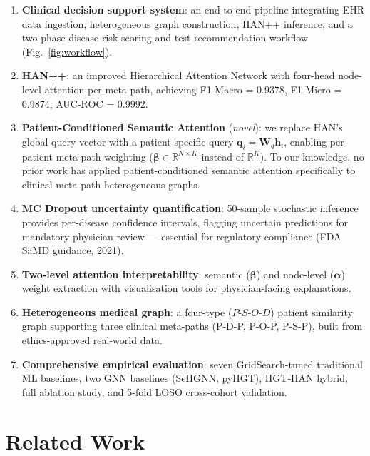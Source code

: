\documentclass[conference]{IEEEtran}
\begin{document}
\begin{enumerate}
  \item \textbf{Clinical decision support system}: an end-to-end pipeline
        integrating EHR data ingestion, heterogeneous graph construction,
        HAN++ inference, and a two-phase disease risk scoring and test
        recommendation workflow (Fig.~\ref{fig:workflow}).
  \item \textbf{HAN++}: an improved Hierarchical Attention Network with
        four-head node-level attention per meta-path, achieving
        F1-Macro = 0.9378, F1-Micro = 0.9874, AUC-ROC = 0.9992.
  \item \textbf{Patient-Conditioned Semantic Attention} (\textit{novel}):
        we replace HAN's global query vector with a patient-specific query
        $\mathbf{q}_i = \mathbf{W}_q \mathbf{h}_i$, enabling per-patient
        meta-path weighting ($\boldsymbol{\beta} \in \mathbb{R}^{N \times K}$
        instead of $\mathbb{R}^K$).
        To our knowledge, no prior work has applied patient-conditioned
        semantic attention specifically to clinical meta-path heterogeneous graphs.
  \item \textbf{MC Dropout uncertainty quantification}: 50-sample stochastic
        inference provides per-disease confidence intervals, flagging uncertain
        predictions for mandatory physician review --- essential for regulatory
        compliance (FDA SaMD guidance, 2021).
  \item \textbf{Two-level attention interpretability}: semantic ($\boldsymbol{\beta}$)
        and node-level ($\boldsymbol{\alpha}$) weight extraction with
        visualisation tools for physician-facing explanations.
  \item \textbf{Heterogeneous medical graph}: a four-type ($P$-$S$-$O$-$D$)
        patient similarity graph supporting three clinical meta-paths
        (P-D-P, P-O-P, P-S-P), built from ethics-approved real-world data.
  \item \textbf{Comprehensive empirical evaluation}: seven GridSearch-tuned
        traditional ML baselines, two GNN baselines (SeHGNN, pyHGT), HGT-HAN
        hybrid, full ablation study, and 5-fold LOSO cross-cohort validation.
\end{enumerate}

\section{Related Work}
\label{sec:related}
\end{document}
